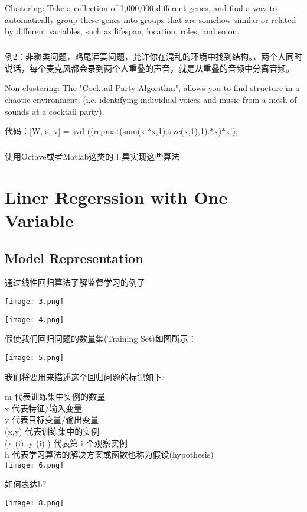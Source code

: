 \documentclass{article}
\begin{document}
\begin{CJK}{UTF8}{gbsn}
Clustering: Take a collection of 1,000,000 different genes, and find a way to automatically group these genes into groups that are somehow similar or related by different variables, such as lifespan, location, roles, and so on.
\subparagraph*{}
例2：非聚类问题，鸡尾酒宴问题，允许你在混乱的环境中找到结构。，两个人同时说话，每个麦克风都会录到两个人重叠的声音，就是从重叠的音频中分离音频。

Non-clustering: The "Cocktail Party Algorithm", allows you to find structure in a chaotic environment. (i.e. identifying individual voices and music from a mesh of sounds at a cocktail party).

代码：[W, s, v] = svd ((repmat(sum(x.$*$x,1),size(x,1),1).$*$x)$*$x');
\subparagraph*{}
使用Octave或者Matlab这类的工具实现这些算法
\newpage

\section{Liner Regerssion with One Variable}
\subsection{Model Representation}
通过线性回归算法了解监督学习的例子

\texttt{[image: 3.png]}

\texttt{[image: 4.png]}

假使我们回归问题的数量集(Training Set)如图所示：

\texttt{[image: 5.png]}

我们将要用来描述这个回归问题的标记如下:

m 代表训练集中实例的数量\\

x 代表特征/输入变量\\

y 代表目标变量/输出变量\\

(x,y) 代表训练集中的实例\\

(x (i) ,y (i) ) 代表第 i 个观察实例\\

h 代表学习算法的解决方案或函数也称为假设(hypothesis)\\

\texttt{[image: 6.png]}

如何表达h?

\texttt{[image: 8.png]}


\end{CJK}
\end{document}
